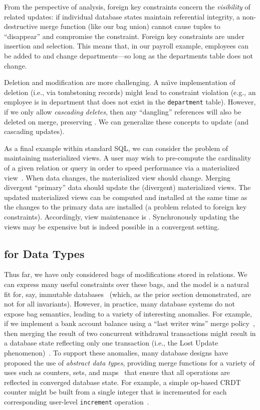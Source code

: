 From the perspective of \iconfluence analysis, foreign key constraints
concern the \textit{visibility} of related updates: if individual
database states maintain referential integrity, a non-destructive
merge function (like our bag union) cannot cause tuples to
``disappear'' and compromise the constraint. Foreign key constraints
are \iconfluent under insertion and selection. This means that, in our
payroll example, employees can be added to and change departments---so
long as the departments table does not change.

Deletion and modification are more challenging. A na\"{\i}ve
implementation of deletion (i.e., via tombstoning records) might lead
to constraint violation (e.g., an employee is in department that does
not exist in the \texttt{department} table). However, if we only allow
\textit{cascading deletes}, then any ``dangling'' references will also
be deleted on merge, preserving \iconfluence. We can generalize these
concepts to update (and cascading updates).

 As a final example within standard SQL,
we can consider the problem of maintaining materialized views. A user
may wish to pre-compute the cardinality of a given relation or query
in order to speed performance via a materialized
view~\cite{gray-book}. When data changes, the materialized view should
change. Merging divergent ``primary'' data should update the
(divergent) materialized views. The updated materialized views can be
computed and installed at the same time as the changes to the primary
data are installed (a problem related to foreign key
constraints). Accordingly, view maintenance is
\iconfluent. Synchronously updating the views may be expensive but is
indeed possible in a convergent setting.

\subsection{\iconfluence for Data Types}

Thus far, we have only considered bags of modifications stored in
relations. We can express many useful constraints over these bags, and
the model is a natural fit for, say, immutable
databases~\cite{gray-virtues,gray-book} (which, as the prior section
demonstrated, are not \iconfluent for all invariants). However, in
practice, many database systems do not expose bag semantics, leading
to a variety of interesting anomalies. For example, if we implement a
bank account balance using a ``last writer wins'' merge
policy~\cite{vogels-defs}, then merging the result of two concurrent
withdrawal transactions might result in a database state reflecting
only one transaction (i.e., the Lost Update
phenomenon)~\cite{adya-isolation,hat-vldb}. To support these
anomalies, many database designs have proposed the use of
\textit{abstract data types}, providing merge functions for a variety
of uses such as counters, sets, and
maps~\cite{crdt,atomictransactions,weihl-thesis,blooml} that ensure
that all operations are reflected in converged database state. For
example, a simple op-based CRDT counter might be built from a single
integer that is incremented for each corresponding user-level
\texttt{increment} operation~\cite{crdt}.

